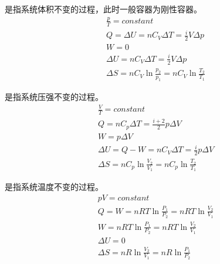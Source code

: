         \begin{Itemize}
            \item {}是指系统体积不变的过程，此时一般容器为刚性容器。            
            \begin{equation}
                \begin{aligned}
                    &\frac{p}{T} = constant \\
                    &Q = \Delta U = nC_{V}\Delta T = \frac{i}{2}V\Delta p \\
                    &W = 0 \\
                    &\Delta U = nC_{V}\Delta T = \frac{i}{2}V\Delta p \\ 
                    &\Delta S = nC_{V}\ln\frac{p_{2}}{p_{1}} =nC_{V}\ln\frac{T_{2}}{T_{1}}
                \end{aligned}
                \nonumber
            \end{equation}
            \item {}是指系统压强不变的过程。
            \begin{equation}
                \begin{aligned}
                    &\frac{V}{T} = constant \\
                    &Q = nC_{p}\Delta T =\frac{i+2}{2}p\Delta V\\
                    &W = p\Delta{V} \\
                    &\Delta U = Q - W = nC_{V}\Delta T = \frac{i}{2}p\Delta V \\ 
                    &\Delta S = nC_{p}\ln\frac{V_{2}}{V_{1}} =nC_{p}\ln\frac{T_{2}}{T_{1}}
                \end{aligned}
                \nonumber
            \end{equation}
            \item {}是指系统温度不变的过程。
            \begin{equation}
                \begin{aligned}
                    &pV = constant \\
                    &Q = W = nRT\ln\frac{P_1}{P_2} = nRT\ln\frac{V_2}{V_1}\\
                    &W = nRT\ln\frac{P_1}{P_2} = nRT\ln\frac{V_2}{V_1} \\
                    &\Delta U = 0 \\ 
                    &\Delta S = nR\ln\frac{V_{2}}{V_{1}} =nR\ln\frac{P_{1}}{P_{2}}

\end{aligned}
\end{equation}
\end{Itemize}
